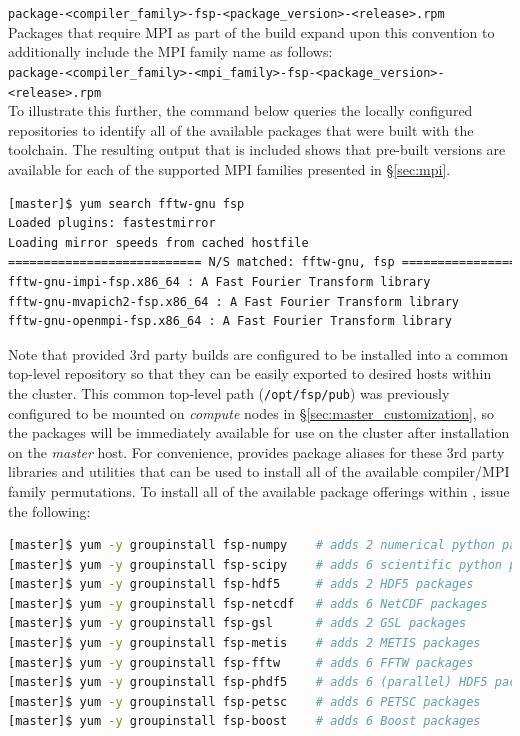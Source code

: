 \documentclass[letterpaper]{article}
\begin{document}
\noindent
\texttt{package-<compiler\_family>-fsp-<package\_version>-<release>.rpm} \\

\noindent Packages that require MPI as part of the build expand upon this convention to
additionally include the MPI family name as follows: \\

\noindent
\texttt{package-<compiler\_family>-<mpi\_family>-fsp-<package\_version>-<release>.rpm} \\

To illustrate this further, the command below queries the locally configured
repositories to identify all of the available \FFTW{} packages that were built
with the \GNU{} toolchain. The resulting output that is included shows that
pre-built versions are available for each of the supported MPI families
presented in \S\ref{sec:mpi}.

\begin{lstlisting}[language=bash]
[master]$ yum search fftw-gnu fsp
Loaded plugins: fastestmirror
Loading mirror speeds from cached hostfile
=========================== N/S matched: fftw-gnu, fsp ===========================
fftw-gnu-impi-fsp.x86_64 : A Fast Fourier Transform library
fftw-gnu-mvapich2-fsp.x86_64 : A Fast Fourier Transform library
fftw-gnu-openmpi-fsp.x86_64 : A Fast Fourier Transform library
\end{lstlisting}

Note that \FSP{} provided 3rd party builds are configured to be installed
into a common top-level repository so that they can be easily exported to
desired hosts within the cluster. This common top-level path
(\texttt{/opt/fsp/pub}) was previously configured to be mounted on {\em
  compute} nodes in \S\ref{sec:master_customization}, so the packages will be
immediately available for use on the cluster after installation on the {\em
  master} host.  For convenience, \FSP{} provides package aliases for these 3rd
party libraries and utilities that can be used to install all of the available
compiler/MPI family permutations. To install all of the available package
offerings within \FSP{}, issue the following:

\begin{lstlisting}[language=bash,keywords={},upquote=true,keepspaces]
[master]$ yum -y groupinstall fsp-numpy    # adds 2 numerical python packages
[master]$ yum -y groupinstall fsp-scipy    # adds 6 scientific python packages
[master]$ yum -y groupinstall fsp-hdf5     # adds 2 HDF5 packages
[master]$ yum -y groupinstall fsp-netcdf   # adds 6 NetCDF packages
[master]$ yum -y groupinstall fsp-gsl      # adds 2 GSL packages
[master]$ yum -y groupinstall fsp-metis    # adds 2 METIS packages
[master]$ yum -y groupinstall fsp-fftw     # adds 6 FFTW packages
[master]$ yum -y groupinstall fsp-phdf5    # adds 6 (parallel) HDF5 packages
[master]$ yum -y groupinstall fsp-petsc    # adds 6 PETSC packages
[master]$ yum -y groupinstall fsp-boost    # adds 6 Boost packages
\end{lstlisting}
\end{document}
